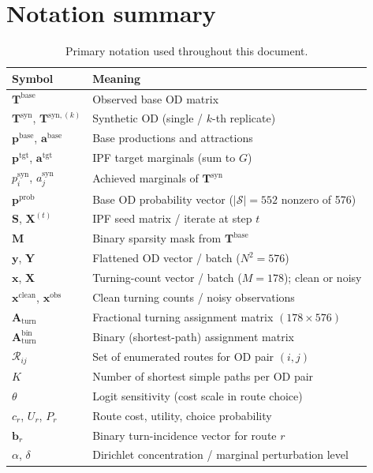 \documentclass[11pt,a4paper]{report}
\newcommand{\Tbase}{\mathbf{T}^{\mathrm{base}}}
\newcommand{\Tsyn}{\mathbf{T}^{\mathrm{syn}}}
\newcommand{\Tsynk}[1]{\mathbf{T}^{\mathrm{syn},(#1)}}
\newcommand{\Xipf}[1]{\mathbf{X}^{(#1)}}
\newcommand{\mathbfp}{\mathbf{p}}
\newcommand{\mathbfa}{\mathbf{a}}
\newcommand{\mathbfS}{\mathbf{S}}
\newcommand{\mathbfM}{\mathbf{M}}
\newcommand{\mathbfy}{\mathbf{y}}
\newcommand{\mathbfx}{\mathbf{x}}
\newcommand{\mathbfX}{\mathbf{X}}
\newcommand{\mathbfY}{\mathbf{Y}}
\newcommand{\Aturn}{\mathbf{A}_{\mathrm{turn}}}
\begin{document}
\section{Notation summary}

\begin{table}[ht]
\centering
\caption{Primary notation used throughout this document.}
\label{tab:notation}
\small
\begin{tabular}{@{}ll@{}}
\toprule
\textbf{Symbol} & \textbf{Meaning} \\
\midrule
$\Tbase$ & Observed base OD matrix \\
$\Tsyn$, $\Tsynk{k}$ & Synthetic OD (single / $k$-th replicate) \\
$\mathbfp^{\mathrm{base}}$, $\mathbfa^{\mathrm{base}}$ & Base productions and attractions \\
$\mathbfp^{\mathrm{tgt}}$, $\mathbfa^{\mathrm{tgt}}$ & IPF target marginals (sum to $G$) \\
$p_i^{\mathrm{syn}}$, $a_j^{\mathrm{syn}}$ & Achieved marginals of $\Tsyn$ \\
$\mathbfp^{\mathrm{prob}}$ & Base OD probability vector ($|\mathcal{S}|=552$ nonzero of 576) \\
$\mathbfS$, $\Xipf{t}$ & IPF seed matrix / iterate at step $t$ \\
$\mathbfM$ & Binary sparsity mask from $\Tbase$ \\
$\mathbfy$, $\mathbfY$ & Flattened OD vector / batch ($N^2=576$) \\
$\mathbfx$, $\mathbfX$ & Turning-count vector / batch ($M=178$); clean or noisy \\
$\mathbfx^{\mathrm{clean}}$, $\mathbfx^{\mathrm{obs}}$ & Clean turning counts / noisy observations \\
$\Aturn$ & Fractional turning assignment matrix $(178 \times 576)$ \\
$\Aturn^{\mathrm{bin}}$ & Binary (shortest-path) assignment matrix \\
$\mathcal{R}_{ij}$ & Set of enumerated routes for OD pair $(i,j)$ \\
$K$ & Number of shortest simple paths per OD pair \\
$\theta$ & Logit sensitivity (cost scale in route choice) \\
$c_r$, $U_r$, $P_r$ & Route cost, utility, choice probability \\
$\mathbf{b}_r$ & Binary turn-incidence vector for route $r$ \\
$\alpha$, $\delta$ & Dirichlet concentration / marginal perturbation level \\
\bottomrule
\end{tabular}
\end{table}
\end{document}

